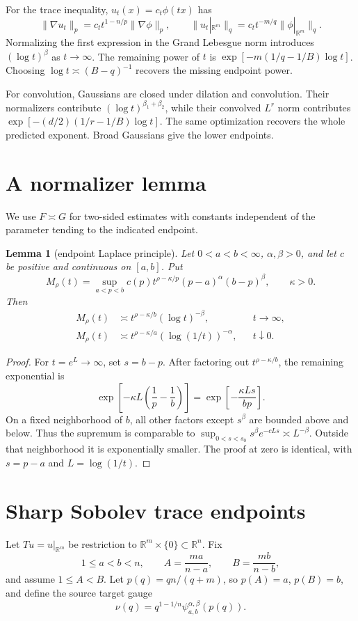 \documentclass[11pt]{article}
\newtheorem{lemma}{Lemma}
\newcommand{\R}{\mathbb R}
\newcommand{\norm}[1]{\lVert#1\rVert}
\begin{document}
For the trace inequality, $u_t(x)=c_t\phi(tx)$ has
\[
 \norm{\nabla u_t}_p=c_t t^{1-n/p}\norm{\nabla\phi}_p,\qquad
 \norm{u_t|_{\R^m}}_q=c_t t^{-m/q}\norm{\phi|_{\R^m}}_q.
\]
Normalizing the first expression in the Grand Lebesgue norm introduces
$(\log t)^\beta$ as $t\to\infty$. The remaining power of $t$ is
$\exp[-m(1/q-1/B)\log t]$. Choosing
$\log t\asymp(B-q)^{-1}$ recovers the missing endpoint power.

For convolution, Gaussians are closed under dilation and convolution. Their
normalizers contribute $(\log t)^{\beta_1+\beta_2}$, while their convolved
$L^r$ norm contributes
$\exp[-(d/2)(1/r-1/B)\log t]$. The same optimization recovers the whole
predicted exponent. Broad Gaussians give the lower endpoints.

\section{A normalizer lemma}
We use $F\asymp G$ for two-sided estimates with constants independent of the
parameter tending to the indicated endpoint.

\begin{lemma}[endpoint Laplace principle]\label{lem:laplace}
Let $0<a<b<\infty$, $\alpha,\beta>0$, and let $c$ be positive and
continuous on $[a,b]$. Put
\[
 M_\rho(t)=\sup_{a<p<b}
 c(p)t^{\rho-\kappa/p}(p-a)^\alpha(b-p)^\beta,\qquad \kappa>0.
\]
Then
\begin{align*}
 M_\rho(t)&\asymp
 t^{\rho-\kappa/b}(\log t)^{-\beta},&&t\to\infty,\\
 M_\rho(t)&\asymp
 t^{\rho-\kappa/a}(\log(1/t))^{-\alpha},&&t\downarrow0.
\end{align*}
\end{lemma}

\begin{proof}
For $t=e^L\to\infty$, set $s=b-p$. After factoring out
$t^{\rho-\kappa/b}$, the remaining exponential is
\[
 \exp\!\left[-\kappa L\left(\frac1p-\frac1b\right)\right]
 =\exp\!\left[-\frac{\kappa Ls}{bp}\right].
\]
On a fixed neighborhood of $b$, all other factors except $s^\beta$ are
bounded above and below. Thus the supremum is comparable to
$\sup_{0<s<s_0}s^\beta e^{-cLs}\asymp L^{-\beta}$. Outside that
neighborhood it is exponentially smaller. The proof at zero is identical,
with $s=p-a$ and $L=\log(1/t)$.
\end{proof}

\section{Sharp Sobolev trace endpoints}
Let $T u=u|_{\R^m}$ be restriction to
$\R^m\times\{0\}\subset\R^n$. Fix
\[
 1\le a<b<n,\qquad
 A=\frac{ma}{n-a},\qquad B=\frac{mb}{n-b},
 \tag{2}
\]
and assume $1\le A<B$. Let $p(q)=qn/(q+m)$, so $p(A)=a$,
$p(B)=b$, and define the source target gauge
\[
 \nu(q)=q^{1-1/n}\psi_{a,b}^{\alpha,\beta}(p(q)).
 \tag{3}
\]
\end{document}
